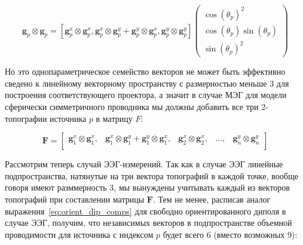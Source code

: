 \begin{equation*}
    \mathbf{g}_p \otimes \mathbf{g}_p =
    [\mathbf{g}_p^x \otimes \mathbf{g}_p^x, \mathbf{g}_p^x \otimes \mathbf{g}_p^y +
     \mathbf{g}_p^y \otimes \mathbf{g}_p^x, \mathbf{g}_p^y \otimes \mathbf{g}_p^y]
    \left({\begin{array}{ccc}
                \cos{(\theta_p)}^2 \\
                \cos{(\theta_p)} \sin{(\theta_p)} \\
                \sin{(\theta_p)}^2
    \end{array}}
    \right)
\end{equation*}

Но это однопараметрическое семейство векторов не может быть эффективно сведено к линейному векторному
пространству с размерностью меньше 3 для построения соответствующего проектора,
а значит в случае МЭГ для модели сферически симметричного проводника мы должны добавить все три
2-топографии источника $p$ в матрицу $F$:

\begin{equation}
    \mathbf{F} =
    \begin{bmatrix}
        \mathbf{g}_1^x \otimes \mathbf{g}_1^x, &
        \mathbf{g}_1^x \otimes \mathbf{g}_1^y + \mathbf{g}_1^y \otimes \mathbf{g}_1^x, &
        \mathbf{g}_2^x \otimes \mathbf{g}_2^x, &
        \dots, & \mathbf{g}_n^y \otimes \mathbf{g}_n^y \\
    \end{bmatrix}
\end{equation}

Рассмотрим теперь случай ЭЭГ-измерений. Так как в случае ЭЭГ линейные подпространства, натянутые
на три вектора топографий в каждой точке, вообще говоря имеют разммерность 3, мы вынуждены
учитывать каждый из векторов топографий при составлении матрицы $\mathbf{F}$.
Тем не менее, расписав аналог выражения~\ref{eq:orient_dip_comps}
для свободно ориентированного диполя в случае ЭЭГ,
получим, что независимых векторов  в подпространстве объемной проводимости для источника с индексом $p$
будет всего 6 (вместо возможных 9):


